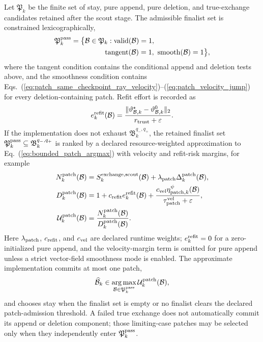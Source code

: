 \documentclass[
  reprint,
  amsmath,
  amssymb,
  aps,
  pra,
  nofootinbib,
  superscriptaddress,
  floatfix
]{revtex4-2}
\newcommand{\swap}{\mathrm{exchange}}
\newcommand{\eps}{\varepsilon}
\begin{document}
Let \(\mathfrak P_k\) be the finite set of stay, pure append, pure deletion, and true-exchange candidates retained after the scout stage.  The admissible finalist set is constrained lexicographically,
\begin{equation}
\begin{aligned}
\mathfrak P_k^{\rm pass}
={}&
\bigl\{\mathcal B\in\mathfrak P_k:
\mathrm{valid}(\mathcal B)=1,\\
&\hspace{3.4em}
\mathrm{tangent}(\mathcal B)=1,\ 
\mathrm{smooth}(\mathcal B)=1
\bigr\},
\end{aligned}
\label{eq:exchange_pass_set}
\end{equation}
where the tangent condition contains the conditional append and deletion tests above, and the smoothness condition contains Eqs.~(\ref{eq:patch_same_checkpoint_ray_velocity})--(\ref{eq:patch_velocity_jump}) for every deletion-containing patch.  Refit effort is recorded as
\begin{equation}
e_k^{\rm refit}(\mathcal B)
=
\frac{\|\vartheta_{\mathcal B,k}^{\star}-\vartheta_{\mathcal B,k}^{0}\|_2}
{r_{\rm trust}+\eps}.
\label{eq:exchange_refit_effort}
\end{equation}
If the implementation does not exhaust \(\mathfrak B_k^{q_-,q_+}\), the
retained finalist set \(\mathfrak P_k^{\rm pass}\subseteq
\mathfrak B_k^{q_-,q_+}\) is ranked by a declared resource-weighted
approximation to Eq.~(\ref{eq:bounded_patch_argmax}) with velocity and
refit-risk margins, for example
\begin{equation}
\begin{aligned}
N_k^{\rm patch}(\mathcal B)
&=
S_k^{\swap,\mathrm{scout}}(\mathcal B)
+\lambda_{\rm patch}\Delta_k^{\rm patch}(\mathcal B),\\
D_k^{\rm patch}(\mathcal B)
&=
1+c_{\rm refit}e_k^{\rm refit}(\mathcal B)
+\frac{c_{\rm vel}\eta_{{\rm patch},k}^{\psi}(\mathcal B)}
{\tau_{\rm patch}^{\rm vel}+\eps},\\
\mathcal U_k^{\rm patch}(\mathcal B)
&=
\frac{N_k^{\rm patch}(\mathcal B)}
{D_k^{\rm patch}(\mathcal B)}.
\end{aligned}
\label{eq:exchange_patch_utility}
\end{equation}
Here \(\lambda_{\rm patch}\), \(c_{\rm refit}\), and \(c_{\rm vel}\) are declared runtime weights; \(e_k^{\rm refit}=0\) for a zero-initialized pure append, and the velocity-margin term is omitted for pure append unless a strict vector-field smoothness mode is enabled.
The approximate implementation commits at most one patch,
\begin{equation}
\widehat{\mathcal B}_k\in
\operatorname*{arg\,max}_{\mathcal B\in\mathfrak P_k^{\rm pass}}
\mathcal U_k^{\rm patch}(\mathcal B),
\label{eq:exchange_patch_select}
\end{equation}
and chooses stay when the finalist set is empty or no finalist clears the declared patch-admission threshold.  A failed true exchange does not automatically commit its append or deletion component; those limiting-case patches may be selected only when they independently enter \(\mathfrak P_k^{\rm pass}\).
\end{document}
